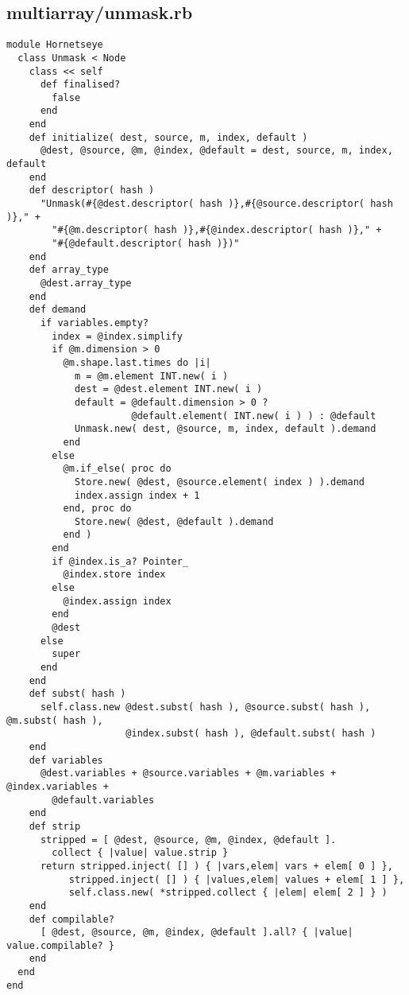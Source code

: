 \subsection{multiarray/unmask.rb}\label{cha:multiarray-unmask-rb}
\begin{lstlisting}
module Hornetseye
  class Unmask < Node
    class << self
      def finalised?
        false
      end
    end
    def initialize( dest, source, m, index, default )
      @dest, @source, @m, @index, @default = dest, source, m, index, default
    end
    def descriptor( hash )
      "Unmask(#{@dest.descriptor( hash )},#{@source.descriptor( hash )}," +
        "#{@m.descriptor( hash )},#{@index.descriptor( hash )}," +
        "#{@default.descriptor( hash )})"
    end
    def array_type
      @dest.array_type
    end
    def demand
      if variables.empty?
        index = @index.simplify
        if @m.dimension > 0
          @m.shape.last.times do |i|
            m = @m.element INT.new( i )
            dest = @dest.element INT.new( i )
            default = @default.dimension > 0 ?
                      @default.element( INT.new( i ) ) : @default
            Unmask.new( dest, @source, m, index, default ).demand
          end  
        else
          @m.if_else( proc do
            Store.new( @dest, @source.element( index ) ).demand
            index.assign index + 1
          end, proc do
            Store.new( @dest, @default ).demand
          end )
        end
        if @index.is_a? Pointer_
          @index.store index
        else
          @index.assign index
        end
        @dest
      else
        super
      end
    end
    def subst( hash )
      self.class.new @dest.subst( hash ), @source.subst( hash ), @m.subst( hash ),
                     @index.subst( hash ), @default.subst( hash )
    end
    def variables
      @dest.variables + @source.variables + @m.variables + @index.variables +
        @default.variables
    end
    def strip
      stripped = [ @dest, @source, @m, @index, @default ].
        collect { |value| value.strip }
      return stripped.inject( [] ) { |vars,elem| vars + elem[ 0 ] },
           stripped.inject( [] ) { |values,elem| values + elem[ 1 ] },
           self.class.new( *stripped.collect { |elem| elem[ 2 ] } )
    end
    def compilable?
      [ @dest, @source, @m, @index, @default ].all? { |value| value.compilable? }
    end
  end
end
\end{lstlisting}
